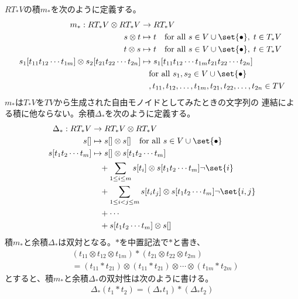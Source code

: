 	$RT_*V$の積$m_*$を次のように定義する。
	\begin{equation}\begin{split} %
		m_*: RT_*V\otimes RT_*V &\to RT_*V \\
		s\otimes t &\mapsto t \quad\text{for all }s\in V\cup\set{\bullet},\;t\in T_*V \\
		t\otimes s &\mapsto t \quad\text{for all }s\in V\cup\set{\bullet},\;t\in T_*V \\
		s_1[t_{11}t_{12}\cdots t_{1m}]\otimes s_2[t_{21}t_{22}\cdots t_{2n}] 
		&\mapsto s_1[t_{11}t_{12}\cdots t_{1m}t_{21}t_{22}\cdots t_{2n}] \\
		&\quad\text{for all }s_1,s_2\in V\cup\set{\bullet}\\
		&\quad, t_{11},t_{12},\dots,t_{1m},t_{21},t_{22},\dots,t_{2n}\in TV \\
	\end{split}\end{equation} %
	$m_*$は$T_*V$を$TV$から生成された自由モノイドとしてみたときの文字列の
	連結による積に他ならない。余積$\Delta_*$を次のように定義する。
	\begin{equation}\begin{split} %
		\Delta_*: RT_*V &\to RT_*V\otimes RT_*V \\
		s[] &\mapsto s[]\otimes s[] \quad\text{for all }s\in V\cup\set{\bullet} \\
		s[t_1t_2\cdots t_m] &\mapsto s[]\otimes s[t_1t_2\cdots t_m] \\
			&\quad + \sum_{1\le i\le m} s[t_i]\otimes s[t_1t_2\cdots t_m]\neg\set{i} \\
			&\quad + \sum_{1\le i<j\le m} s[t_it_j]\otimes s[t_1t_2\cdots t_m]\neg\set{i,j} \\
			&\quad + \cdots \\
			&\quad + s[t_1t_2\cdots t_m]\otimes s[]
	\end{split}\end{equation} %
	積$m_*$と余積$\Delta_*$は双対となる。$*$を中置記法で$*$と書き、
	\begin{equation}\begin{split} %
		&(t_{11}\otimes t_{12}\otimes t_{1m})*(t_{21}\otimes t_{22}\otimes t_{2m}) \\
		&=(t_{11}*t_{21})\otimes(t_{11}*t_{21})\otimes\cdots\otimes(t_{1m}*t_{2m})
	\end{split}\end{equation} %
	とすると、積$m_*$と余積$\Delta_*$の双対性は次のように書ける。
	\begin{equation}\begin{split} %
		\Delta_*(t_1*t_2) = (\Delta_*t_1)*(\Delta_*t_2) \\
	\end{split}\end{equation} %
